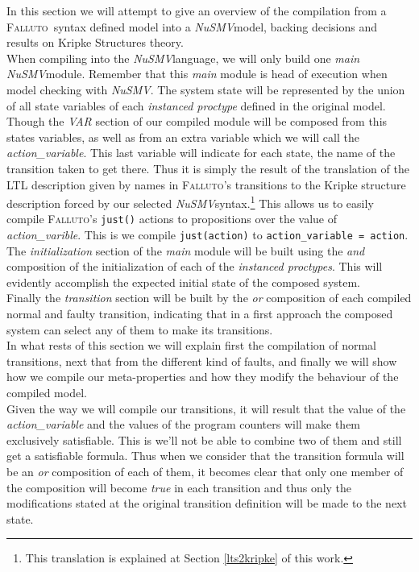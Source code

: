 \documentclass[12pt]{llncs2e/llncs}
\newcommand{\nusmv}{\mbox{\textit{NuSMV}}}
\newcommand{\falluto}{\mbox{\textsc{Falluto}}}
\newcommand{\fallutoSp}{\mbox{\textsc{Falluto~}}}
\begin{document}
In this section we will attempt to give an overview of the compilation from a \fallutoSp syntax defined model into a \nusmv model, backing decisions and results on Kripke Structures theory.\\
When compiling into the \nusmv language, we will only build one \textit{main} \nusmv module. Remember that this \textit{main} module is head of execution when model checking with \nusmv. The system state will be represented by the union of all state variables of each \textit{instanced proctype} defined in the original model. Though the \textit{VAR} section of our compiled module will be composed from this states variables, as well as from an extra variable which we will call the \textit{action\_variable}. This last variable will indicate for each state, the name of the transition taken to get there. Thus it is simply the result of the translation of the LTL description given by names in \falluto's transitions to the Kripke structure description forced by our selected \nusmv syntax.\footnote{ This translation is explained at Section \ref{lts2kripke} of this work.} This allows us to easily compile \falluto's \texttt{just()} actions to propositions over the value of \textit{action\_varible}. This is we compile \texttt{just(action)} to \texttt{action\_variable = action}.\\
The \textit{initialization} section of the \textit{main} module will be built using the \textit{and} composition of the initialization of each of the \textit{instanced proctypes}. This will evidently accomplish the expected initial state of the composed system.\\
Finally the \textit{transition} section will be built by the \textit{or} composition of each compiled normal and faulty transition, indicating that in a first approach the composed system can select any of them to make its transitions.\\
In what rests of this section we will explain first the compilation of normal transitions, next that from the different kind of faults, and finally we will show how we compile our meta-properties and how they modify the behaviour of the compiled model.\\
Given the way we will compile our transitions, it will result that the value of the \textit{action\_variable} and the values of the program counters will make them exclusively satisfiable. This is we'll not be able to combine two of them and still get a satisfiable formula. Thus when we consider that the transition formula will be an \textit{or} composition of each of them, it becomes clear that only one member of the composition will become \textit{true} in each transition and thus only the modifications stated at the original transition definition will be made to the next state.
\end{document}
